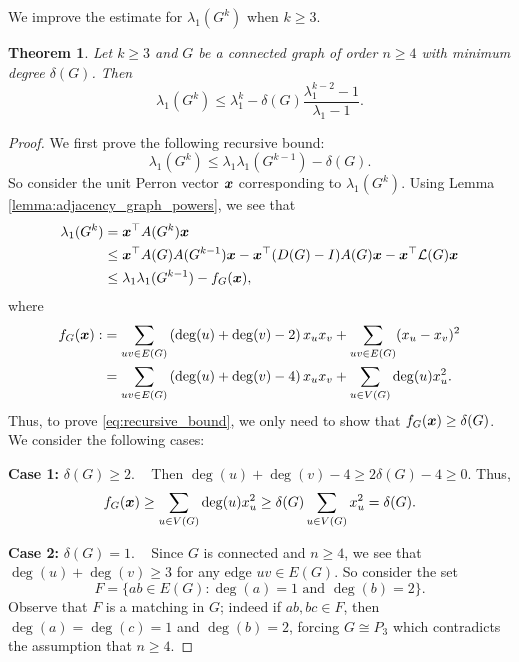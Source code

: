 \documentclass[11pt]{article}
\theoremstyle{plain}
\newtheorem{theorem}{Theorem}[section]
\numberwithin{equation}{section}
\def\x{\mbox{\boldmath $x$}}
\begin{document}
We improve the estimate for $\lambda_1(G^k)$ when $k\ge 3$.

\begin{theorem}\label{thm:spectral_radius_higher_power}
Let $k\ge 3$ and $G$ be a connected graph of order $n\ge 4$ with minimum degree $\delta(G)$. Then 
\[\lambda_1(G^k) \le \lambda_1^k - \delta(G)\frac{\lambda_1^{k-2}-1}{\lambda_1 -1}.\]
\end{theorem} 

\begin{proof} 
    We first prove the following recursive bound:
    \begin{equation}\label{eq:recursive_bound}
        \lambda_1(G^k)\le \lambda_1 \lambda_1(G^{k-1}) - \delta(G).
    \end{equation}
    So consider the unit Perron vector $\x$ corresponding to $\lambda_1(G^k)$. Using Lemma \ref{lemma:adjacency_graph_powers}, we see that 
    \begin{align*}
        \lambda_1(G^k) 
        & = \x^\top A(G^k) \x \\
        & \le \x^\top A(G)A(G^{k-1})\x - \x^\top (D(G)-I)A(G)\x - \x^\top \mathcal{L}(G)\x\\
        & \le \lambda_1\lambda_1(G^{k-1}) - f_G(\x), 
    \end{align*}
    where 
    \begin{align*}
      f_G(\x):& = \sum_{uv\in E(G)} \left(\deg(u)+\deg(v)-2\right)x_ux_v + \sum_{uv\in E(G)} (x_u-x_v)^2 \\
      & = \sum_{uv\in E(G)} \left(\deg(u)+\deg(v)-4\right)x_ux_v + \sum_{u\in V(G)} \deg(u)x_u^2.
    \end{align*}
    Thus, to prove \eqref{eq:recursive_bound}, we only need to show that $f_G(\x)\ge \delta(G)$. We consider the following cases:

    \textbf{Case 1:} $\delta(G)\ge 2$. ~ Then $\deg(u)+\deg(v)-4\ge 2\delta(G)-4\ge 0$. Thus, 
    \[ f_G(\x) \ge \sum_{u\in V(G)} \deg(u)x_u^2 \ge \delta(G)\sum_{u\in V(G)}x_u^2  = \delta(G). \]

   \textbf{Case 2:} $\delta(G) = 1$. ~ Since $G$ is connected and $n\ge 4$, we see that $\deg(u) + \deg(v)\ge 3$ for any edge $uv\in E(G)$. So consider the set 
   \[F = \{ab\in E(G): \deg(a)=1 \text{ and }\deg(b) =2\}.\]
   Observe that $F$ is a matching in $G$; indeed if $ab, bc\in F$, then $\deg(a) = \deg(c) = 1$ and $\deg(b)=2$, forcing $G\cong P_3$ which contradicts the assumption that $n\ge 4$.  
   

\end{proof}
\end{document}
